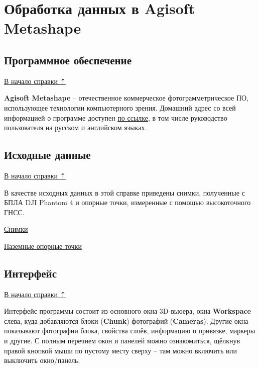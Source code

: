 \documentclass[
  12pt,
]{book}
\begin{document}
\hypertarget{agisoft}{%
\chapter{Обработка данных в Agisoft Metashape}\label{agisoft}}

\hypertarget{agisoft-soft}{%
\section{Программное обеспечение}\label{agisoft-soft}}

\protect\hyperlink{agisoft}{В начало справки ⇡}

\textbf{Agisoft Metashape} -- отечественное коммерческое фотограмметрическое ПО, использующее технологии компьютерного зрения. Домашний адрес со всей информацией о программе доступен \href{https://www.agisoft.com/}{по ссылке}, в том числе руководство пользователя на русском и английском языках.

\hypertarget{agisoft-initial}{%
\section{Исходные данные}\label{agisoft-initial}}

\protect\hyperlink{agisoft}{В начало справки ⇡}

В качестве исходных данных в этой справке приведены снимки, полученные с БПЛА DJI Phantom 4 и опорные точки, измеренные с помощью высокоточного ГНСС.

\href{https://disk.yandex.ru/d/E8aQT6f8C_KBuw}{Снимки}

\href{https://disk.yandex.ru/d/_5-zxp2QLPxKxQ}{Наземные опорные точки}

\hypertarget{agisoft-interface}{%
\section{Интерфейс}\label{agisoft-interface}}

\protect\hyperlink{agisoft}{В начало справки ⇡}

Интерфейс программы состоит из основного окна 3D-вьюера, окна \textbf{Workspace} слева, куда добавляются блоки (\textbf{Chunk}) фотографий (\textbf{Cameras}). Другие окна показывают фотографии блока, свойства слоёв, информацию о привязке, маркеры и другие. С полным перечнем окон и панелей можно ознакомиться, щёлкнув правой кнопкой мыши по пустому месту сверху -- там можно включить или выключить окно/панель.
\end{document}
